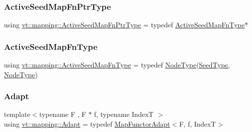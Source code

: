 \subsubsection{\texorpdfstring{Active\+Seed\+Map\+Fn\+Ptr\+Type}{ActiveSeedMapFnPtrType}}
{\footnotesize\ttfamily using \hyperlink{namespacevt_1_1mapping_a254b50d55be91c3bd002481b2e96da7e}{vt\+::mapping\+::\+Active\+Seed\+Map\+Fn\+Ptr\+Type} = typedef \hyperlink{namespacevt_1_1mapping_ab9cfcd87eb3ff00e63478d0197056b7e}{Active\+Seed\+Map\+Fn\+Type}$\ast$}

\mbox{\label{namespacevt_1_1mapping_ab9cfcd87eb3ff00e63478d0197056b7e}} 
\subsubsection{\texorpdfstring{Active\+Seed\+Map\+Fn\+Type}{ActiveSeedMapFnType}}
{\footnotesize\ttfamily using \hyperlink{namespacevt_1_1mapping_ab9cfcd87eb3ff00e63478d0197056b7e}{vt\+::mapping\+::\+Active\+Seed\+Map\+Fn\+Type} = typedef \hyperlink{namespacevt_a866da9d0efc19c0a1ce79e9e492f47e2}{Node\+Type}(\hyperlink{namespacevt_ae2e13198bdef4d5b8e603d6c1c7f0969}{Seed\+Type}, \hyperlink{namespacevt_a866da9d0efc19c0a1ce79e9e492f47e2}{Node\+Type})}

\mbox{\label{namespacevt_1_1mapping_aafe187035ce8df02f31983e37cdb6a5d}} 
\subsubsection{\texorpdfstring{Adapt}{Adapt}}
{\footnotesize\ttfamily template$<$typename F , F $\ast$ f, typename IndexT $>$ \\
using \hyperlink{namespacevt_1_1mapping_aafe187035ce8df02f31983e37cdb6a5d}{vt\+::mapping\+::\+Adapt} = typedef \hyperlink{namespacevt_1_1mapping_add4b5257a62b56d194f7e931b608f8f0}{Map\+Functor\+Adapt}$<$F, f, IndexT$>$}

\mbox{\label{namespacevt_1_1mapping_a2910ab582d95478603cdca7480af65b2}} 
